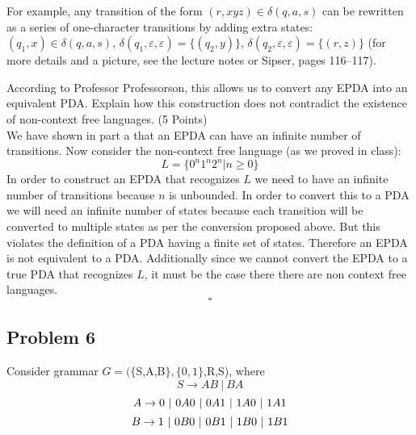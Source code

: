 \documentclass{article}
\begin{document}
\begin{enumerate}[(a)]
    For example, any transition of the form $(r,xyz) \in \delta(q,a,s)$ can be rewritten as a
    series of one-character transitions by adding extra states:
    $(q_1,x)\in\delta(q,a,s)$, $\delta(q_1,\varepsilon,\varepsilon)=
    \{(q_2,y)\}$, $\delta(q_2,\varepsilon,\varepsilon)=\{(r,z)\}$ (for more details and a
    picture, see the lecture notes or Sipser, pages 116--117).

    According to Professor Professorson, this allows us to convert any EPDA into an equivalent
    PDA. Explain how this construction does not contradict the existence of non-context free
    languages. (5 Points)\\

    We have shown in part a that an EPDA can have an infinite number of transitions.
    Now consider the non-context free language (as we proved in class):\\
    \[L=\{0^n1^n2^n | n \geq 0\} \]
    In order to construct an EPDA that recognizes $L$ we need to have an infinite number of
    transitions because $n$ is unbounded. In order to convert this to a PDA we will need
    an infinite number of states because each transition will be converted to multiple states
    as per the conversion proposed above.
    But this violates the definition of a PDA having a finite set of states. Therefore an EPDA
    is not equivalent to a PDA. Additionally since we cannot convert the EPDA to a true PDA
    that recognizes $L$, it must be the case there there are non context free languages.
    \[ \square \]


\end{enumerate}

\newpage


\subsection*{Problem 6}
Consider grammar $G = (\{$S,A,B$\},\{0,1\}$,R,S), where
\[
    S \rightarrow AB\ |\ BA
\]
\[
    A \rightarrow 0\ |\ 0A0\ |\ 0A1\ |\ 1A0\ |\ 1A1 \\
\]
\[
    B \rightarrow 1\ |\ 0B0\ |\ 0B1\ |\ 1B0\ |\ 1B1 \\
\]
\end{document}

